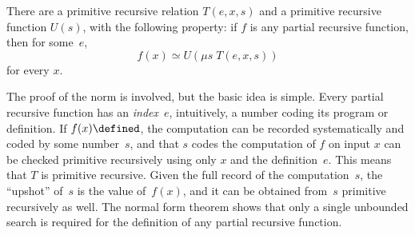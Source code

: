 \documentclass[../../include/open-logic-section]{subfiles}
\begin{document}

\begin{thm}
There are a primitive recursive relation $T(e, x, s)$ and a primitive
recursive function $U(s)$, with the following property: if $f$ is any
partial recursive function, then for some~$e$,
\[
f(x) \simeq U(\mu s \; T(e, x, s))
\]
for every $x$.
\end{thm}

\begin{explain}
The proof of the norm is involved, but the basic idea is simple.
Every partial recursive function has an \emph{index}~$e$, intuitively,
a number coding its program or definition.  If $f(x) \defined$, the
computation can be recorded systematically and coded by some
number~$s$, and that $s$ codes the computation of $f$ on input $x$ can
be checked primitive recursively using only $x$ and the
definition~$e$.  This means that $T$ is primitive recursive.  Given
the full record of the computation~$s$, the ``upshot'' of~$s$ is the
value of~$f(x)$, and it can be obtained from~$s$ primitive recursively
as well.  The normal form theorem shows that only a single unbounded
search is required for the definition of any partial recursive
function.
\end{explain}
\end{document}
